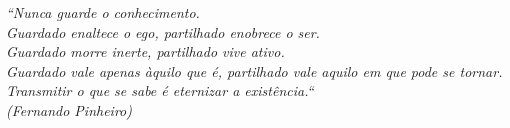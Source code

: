 \begin{epigrafe}
    \vspace*{\fill}
	\begin{flushright}

		\textit{``Nunca guarde o conhecimento.\\ 
        		Guardado enaltece o ego, partilhado enobrece o ser.\\ 
                Guardado morre inerte, partilhado vive ativo.\\ 
                Guardado vale apenas àquilo que é,
                partilhado vale aquilo em que pode se tornar.\\  
                Transmitir o que se sabe é eternizar a existência.``\\
		(Fernando Pinheiro)}
	\end{flushright}
\end{epigrafe}
